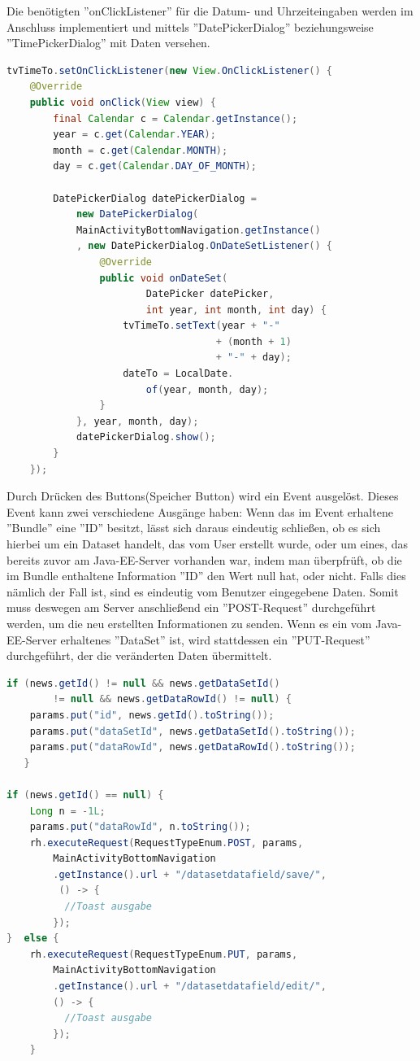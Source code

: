 Die benötigten ''onClickListener'' für die Datum- und Uhrzeiteingaben werden im Anschluss implementiert und mittels ''DatePickerDialog'' beziehungsweise ''TimePickerDialog'' mit Daten versehen. 
\begin{lstlisting}[language=Java,caption={OnClickListener für Datum-Auswahl im NewsEditFragment}]
tvTimeTo.setOnClickListener(new View.OnClickListener() {
	@Override
    public void onClick(View view) {
    	final Calendar c = Calendar.getInstance();
        year = c.get(Calendar.YEAR);
        month = c.get(Calendar.MONTH);
        day = c.get(Calendar.DAY_OF_MONTH);

        DatePickerDialog datePickerDialog = 
        	new DatePickerDialog(
            MainActivityBottomNavigation.getInstance()
            , new DatePickerDialog.OnDateSetListener() {
            	@Override
                public void onDateSet(
                  		DatePicker datePicker,
                   		int year, int month, int day) {
                	tvTimeTo.setText(year + "-" 
                        			+ (month + 1)
                        			+ "-" + day);
                    dateTo = LocalDate.
                    	of(year, month, day);
                }
            }, year, month, day);
            datePickerDialog.show();
        }
    });
\end{lstlisting}

Durch Drücken des Buttons(Speicher Button) wird ein Event ausgelöst. Dieses Event kann zwei verschiedene Ausgänge haben: Wenn das im Event erhaltene ''Bundle'' eine ''ID'' besitzt, lässt sich daraus eindeutig schließen, ob es sich hierbei um ein Dataset handelt, das vom User erstellt wurde, oder um eines, das bereits zuvor am Java-EE-Server vorhanden war, indem man überpfrüft, ob die im Bundle enthaltene Information ''ID'' den Wert null hat, oder nicht. Falls dies nämlich der Fall ist, sind es eindeutig vom Benutzer eingegebene Daten. Somit muss deswegen am Server anschließend ein ''POST-Request'' durchgeführt werden, um die neu erstellten Informationen zu senden.
Wenn es ein vom Java-EE-Server erhaltenes ''DataSet'' ist, wird stattdessen ein ''PUT-Request'' durchgeführt, der die veränderten Daten übermittelt. 
\begin{lstlisting}[language=Java,caption={Unterscheidung der Art der Anfrage im NewsEditFragment}]
if (news.getId() != null && news.getDataSetId() 
		!= null && news.getDataRowId() != null) {
	params.put("id", news.getId().toString());
    params.put("dataSetId", news.getDataSetId().toString());
    params.put("dataRowId", news.getDataRowId().toString());
   } 
       
if (news.getId() == null) {
    Long n = -1L;
    params.put("dataRowId", n.toString());
    rh.executeRequest(RequestTypeEnum.POST, params,
       	MainActivityBottomNavigation
        .getInstance().url + "/datasetdatafield/save/",
         () -> {
          //Toast ausgabe
        });
}  else {
    rh.executeRequest(RequestTypeEnum.PUT, params,
        MainActivityBottomNavigation
        .getInstance().url + "/datasetdatafield/edit/",
       	() -> { 
          //Toast ausgabe
        });                 
    }
\end{lstlisting} 
